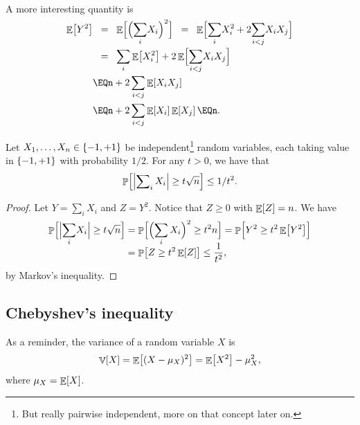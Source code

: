 A more interesting quantity is
\begin{align*}
  \Ex{Y^2} %
  &\EQ%
    \Ex{ \smash{\Bigl(\smash{\sum_i} X_i\Bigr)^2} \Bigr.}%
    \EQ%
    \Ex{\Bigl. \smash{\sum_i} X_i^2 + 2 \smash{\sum_{i < j}} X_i X_j}%
    \\[.2cm]&
    \EQ%
    \sum_i \Ex{  X_i^2} + 2\Ex{  \smash{\sum_{i < j}} X_i X_j \Bigr.}%
    \\&
    \EQ%
    n  + 2 \sum_{i < j} \Ex{ X_i X_j}%
  \\&%
  \EQ%
  n + 2 \sum_{i < j} \Ex{ X_i} \Ex{ X_j}%
  \EQ%
  n.
\end{align*}



\begin{lemma}
    Let $X_1, \ldots, X_n \in \left\{ {-1,+1} \right\}$ be independent\footnote{But really
       pairwise independent, more on that concept later on.}  random
    variables, each taking value in $\left\{ {-1, +1} \right\}$ with probability
    $1/2$. For any $t > 0$, we have that
    \begin{equation*}
        \Prob{ \cardin{\sum\nolimits_i X_i} \geq t \sqrt{n}} \leq 1/t^2.
    \end{equation*}
\end{lemma}

\begin{proof}
    Let $Y= \sum_i X_i$ and $Z =Y^2$. Notice that $Z \geq 0$ with
    $\mathop{\mathbb{E}}\!\left[ {Z} \right] = n$.  We have
    \begin{align*}
        \Prob{ \cardin{\Bigl.\smash{\sum_i} X_i} \geq t \sqrt{n}}%
        &=%
        \Prob{ \smash{ \Bigl(\sum_i X_i\Bigr)^2 \geq t^2 n} \Bigr.}%
        =%
        \Prob{ Y^2 \geq t^2 \Ex{Y^2} \Bigr.} %
        \\&=%
        \Prob{ Z \geq t^2 \Ex{Z}} %
        \leq%
        \frac{1}{t^2},
    \end{align*}
    by Markov's inequality.
\end{proof}


\subsection{Chebyshev's inequality}

As a reminder, the variance of a random variable $X$ is
\begin{equation*}
    \mathop{\mathbb{V}}\!\left[ { X} \right] = \mathop{\mathbb{E}}\!\left[ { (X -\mu_X)^2 } \right] = \mathop{\mathbb{E}}\!\left[ {X^2} \right] - \mu_X^2,
\end{equation*}
where $\mu_X = \mathop{\mathbb{E}}\!\left[ {X} \right]$.




